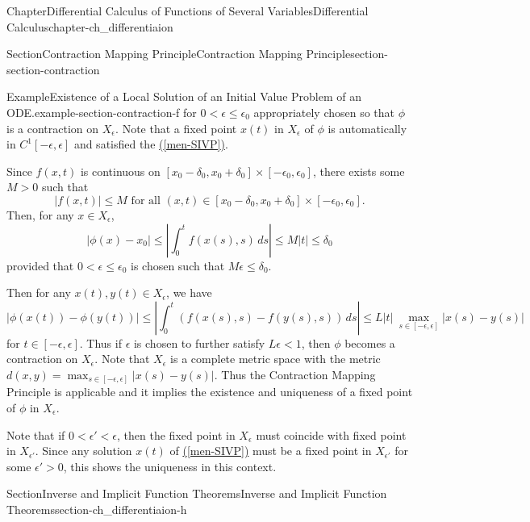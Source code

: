 \documentclass[oneside,10pt,]{book}
\newcommand{\xreffont}{\relax}
\numberwithin{equation}{section}
\newcommand{\lt}{<}
\newcommand{\gt}{>}
\begin{document}
\begin{chapterptx}{Chapter}{Differential Calculus of Functions of Several Variables}{}{Differential Calculus}{}{}{chapter-ch_differentiaion}
\begin{sectionptx}{Section}{Contraction Mapping Principle}{}{Contraction Mapping Principle}{}{}{section-section-contraction}
\begin{example}{Example}{Existence of a Local Solution of an Initial Value Problem of an ODE.}{example-section-contraction-f}
for \(0 \lt \epsilon \le \epsilon_{0}\) appropriately chosen so that \(\phi\) is a contraction on \(X_{\epsilon}\). Note that a fixed point \(x(t)\) in \(X_{\epsilon}\) of \(\phi\) is automatically in \(C^{1}[ -\epsilon, \epsilon]\) and satisfied the \hyperref[men-SIVP]{({\xreffont\ref{men-SIVP}})}.%
\par
Since \(f(x, t)\) is continuous on \([x_{0}-\delta_{0}, x_{0}+\delta_{0}]\times [-\epsilon_{0}, \epsilon_{0}]\), there exists some \(M\gt 0\) such that%
\begin{equation*}
|f(x, t)|\le M \text{ for all $(x, t)\in [x_{0}-\delta_{0}, x_{0}+\delta_{0}]\times [-\epsilon_{0}, \epsilon_{0}]$.}
\end{equation*}
Then, for any \(x\in X_{\epsilon}\),%
\begin{equation*}
|\phi(x)-x_{0}|\le \left| \int_{0}^{t} f(x(s), s)\, ds \right| \le M |t| \le \delta_{0}
\end{equation*}
provided that \(0\lt \epsilon \le \epsilon_{0}\) is chosen such that \(M \epsilon \le \delta_{0}\).%
\par
Then for any \(x(t), y(t)\in X_{\epsilon}\), we have%
\begin{equation*}
|\phi(x(t))-\phi(y(t))|\le \left| \int_{0}^{t} \left( f(x(s), s)-f(y(s), s)\right) \, ds \right|
\le L |t|\ \max_{s\in [ -\epsilon, \epsilon]} |x(s)-y(s)|
\end{equation*}
for \(t\in [ -\epsilon, \epsilon]\). Thus if \(\epsilon\) is chosen to further satisfy \(L\epsilon \lt 1\), then \(\phi\) becomes a contraction on \(X_{\epsilon}\). Note that \(X_{\epsilon}\) is a complete metric space with the metric \(d(x, y)=\max_{s\in [ -\epsilon, \epsilon]} |x(s)-y(s)|\). Thus the Contraction Mapping Principle is applicable and it implies the existence and uniqueness of a fixed point of \(\phi\) in \(X_{\epsilon}\).%
\par
Note that if \(0\lt \epsilon' \lt \epsilon\), then the fixed point in \(X_{\epsilon}\) must coincide with fixed point in \(X_{\epsilon'}\). Since any solution \(x(t)\) of \hyperref[men-SIVP]{({\xreffont\ref{men-SIVP}})} must be a  fixed point in \(X_{\epsilon'}\) for some \(\epsilon' >0\), this shows the uniqueness in this context.%
\end{example}
\end{sectionptx}
%
%
\typeout{************************************************}
\typeout{************************************************}
%
\begin{sectionptx}{Section}{Inverse and Implicit Function Theorems}{}{Inverse and Implicit Function Theorems}{}{}{section-ch_differentiaion-h}

\end{sectionptx}
\end{chapterptx}
\end{document}

